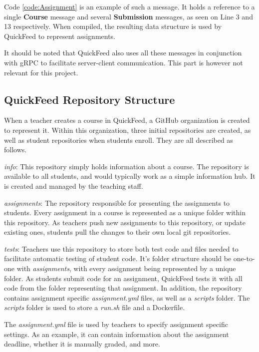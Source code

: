 Code \ref{code:Assignment} is an example of such a message.
It holds a reference to a single \textbf{Course} message and several \textbf{Submission} messages, as seen on Line 3 and 13 respectively.
When compiled, the resulting data structure is used by QuickFeed to represent assignments.

It should be noted that QuickFeed also uses all these messages in conjunction with gRPC to facilitate server-client communication.
This part is however not relevant for this project.

\subsection{QuickFeed Repository Structure}
\label{sec:quickfeed-repository-structure}

When a teacher creates a course in QuickFeed, a GitHub organization is created to represent it.
Within this organization, three initial repositories are created, as well as student repositories when students enroll.
They are all described as follows.

\textit{info}: This repository simply holds information about a course.
The repository is available to all students, and would typically work as a simple information hub.
It is created and managed by the teaching staff.

\textit{assignments}: The repository responsible for presenting the assignments to students.
Every assignment in a course is represented as a unique folder within this repository.
As teachers push new assignments to this repository, or update existing ones, students pull the changes to their own local git repositories.

\textit{tests}: Teachers use this repository to store both test code and files needed to facilitate automatic testing of student code.
It's folder structure should be one-to-one with \textit{assignments}, with every assignment being represented by a unique folder.
As students submit code for an assignment, QuickFeed tests it with all code from the folder representing that assignment.
In addition, the repository contains assignment specific \textit{assignment.yml} files, as well as a \textit{scripts} folder.
The \textit{scripts} folder is used to store a \textit{run.sh} file and a Dockerfile.

The \textit{assignment.yml} file is used by teachers to specify assignment specific settings.
As an example, it can contain information about the assignment deadline, whether it is manually graded, and more.

